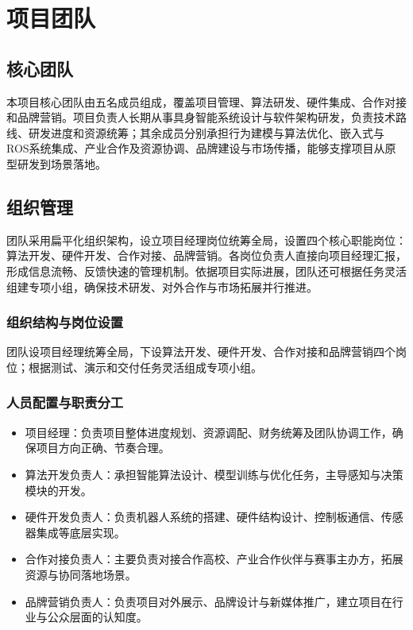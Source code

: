 \documentclass[zihao=-4]{ctexart}
\begin{document}
\section{项目团队}

\subsection{核心团队}

本项目核心团队由五名成员组成，覆盖项目管理、算法研发、硬件集成、合作对接和品牌营销。项目负责人长期从事具身智能系统设计与软件架构研发，负责技术路线、研发进度和资源统筹；其余成员分别承担行为建模与算法优化、嵌入式与ROS系统集成、产业合作及资源协调、品牌建设与市场传播，能够支撑项目从原型研发到场景落地。

\subsection{组织管理}

团队采用扁平化组织架构，设立项目经理岗位统筹全局，设置四个核心职能岗位：算法开发、硬件开发、合作对接、品牌营销。各岗位负责人直接向项目经理汇报，形成信息流畅、反馈快速的管理机制。依据项目实际进展，团队还可根据任务灵活组建专项小组，确保技术研发、对外合作与市场拓展并行推进。


\subsubsection{组织结构与岗位设置}

团队设项目经理统筹全局，下设算法开发、硬件开发、合作对接和品牌营销四个岗位；根据测试、演示和交付任务灵活组成专项小组。

\subsubsection{人员配置与职责分工}

\begin{itemize}[leftmargin=2em]
  \item 项目经理：负责项目整体进度规划、资源调配、财务统筹及团队协调工作，确保项目方向正确、节奏合理。
  \item 算法开发负责人：承担智能算法设计、模型训练与优化任务，主导感知与决策模块的开发。
  \item 硬件开发负责人：负责机器人系统的搭建、硬件结构设计、控制板通信、传感器集成等底层实现。
  \item 合作对接负责人：主要负责对接合作高校、产业合作伙伴与赛事主办方，拓展资源与协同落地场景。
  \item 品牌营销负责人：负责项目对外展示、品牌设计与新媒体推广，建立项目在行业与公众层面的认知度。
\end{itemize}
\end{document}
